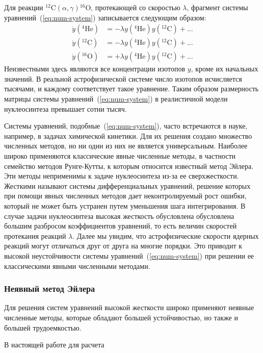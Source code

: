Для реакции \({^{12}}\text{C} (\alpha,\gamma) {^{16}}\text{O}\), протекающей со скоростью $\lambda$, фрагмент системы уравнений~(\ref{eq:num-system}) записывается следующим образом:
\begin{equation}
\begin{aligned}
  \dot{y}({^4}\text{He}) &= - \lambda y({^4}\text{He})y({^{12}}\text{C}) + ...\\
  \dot{y}({^{12}}\text{C}) &= - \lambda y({^4}\text{He})y({^{12}}\text{C}) + ...\\
  \dot{y}({^{16}}\text{O}) &= + \lambda y({^4}\text{He})y({^{12}}\text{C}) + ...
\end{aligned}
\end{equation}
Неизвестными здесь являются все концентрации изотопов $y$, кроме их начальных значений. В реальной астрофизической системе число изотопов исчисляется тысячами, и каждому соответствует такое уравнение. Таким образом размерность матрицы системы уравнений~(\ref{eq:num-system}) в реалистичной модели нуклеосинтеза превышает сотни тысяч.

Системы уравнений, подобные~(\ref{eq:num-system}), часто встречаются в науке, например, в задачах химической кинетики. Для их решения создано множество численных методов, но ни один из них не является универсальным. Наиболее широко применяются классические явные численные методы, в частности семейство методов Рунге-Кутты, к которым относится известный метод Эйлера. Эти методы неприменимы к задаче нуклеосинтеза из-за ее сверхжесткости. Жесткими называют системы дифференциальных уравнений, решение которых при помощи явных численных методов дает неконтролируемый рост ошибки, который не может быть устранен путем уменьшения шага интегрирования. В случае задачи нуклеосинтеза высокая жесткость обусловлена обусловлена большим разбросом коэффициентов уравнений, то есть величин скоростей протекания реакций $\lambda$. Далее мы увидим, что астрофизические скорости ядерных реакций могут отличаться друг от друга на многие порядки. Это приводит к высокой неустойчивости системы уравнений~(\ref{eq:num-system}) при решении ее классическими явными численными методами.

\subsubsection{Неявный метод Эйлера}
Для решения систем уравнений высокой жесткости широко применяют неявные численные методы, которые обладают большей устойчивостью, но также и большей трудоемкостью.

В настоящей работе для расчета 
